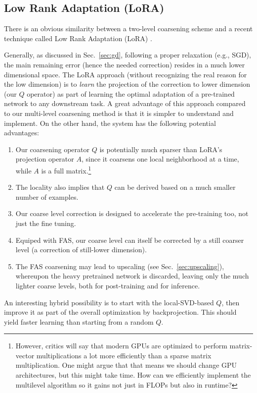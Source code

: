 \documentclass{article} %
\begin{document}
\subsection{Low Rank Adaptation (LoRA)}
There is an obvious similarity between a two-level coarsening scheme and a recent technique called Low Rank Adaptation (LoRA) \cite{lora}.

Generally, as discussed in Sec.~\ref{sec:gd}, following a proper relaxation (e.g., SGD), the main remaining error (hence the needed correction) resides in a much lower dimensional space. The LoRA approach (without recognizing the real reason for the low dimension) is to {\it learn} the projection of the correction to lower dimension (our $Q$ operator) as part of learning the optimal adaptation of a pre-trained network to any downstream task. A great advantage of this approach compared to our multi-level coarsening method is that it is simpler to understand and implement. On the other hand, the system has the following potential advantages:

\begin{enumerate}
    \item Our coarsening operator $Q$ is potentially much sparser than LoRA's projection operator $A$, since it coarsens one local neighborhood at a time, while $A$ is a full matrix.\footnote{However, critics will say that modern GPUs are optimized to perform matrix-vector multiplications a lot more efficiently than a sparse matrix multiplication. One might argue that that means we should change GPU architectures, but this might take time. How can we efficiently implement the multilevel algorithm so it gains not just in FLOPs but also in runtime?}
    \item The locality also implies that $Q$ can be derived based on a much smaller number of examples.
    \item Our coarse level correction is designed to accelerate the pre-training too, not just the fine tuning.
    \item Equiped with FAS, our coarse level can itself be corrected by a still coarser level (a correction of still-lower dimension).
    \item The FAS coarsening may lead to upscaling (see Sec.~\ref{sec:upscaling}), whereupon the heavy pretrained network is discarded, leaving only the much lighter coarse levels, both for post-training and for inference.
\end{enumerate}

An interesting hybrid possibility is to start with the local-SVD-based $Q$, then improve it as part of the overall optimization by backprojection. This should yield faster learning than starting from a random $Q$.
\end{document}
